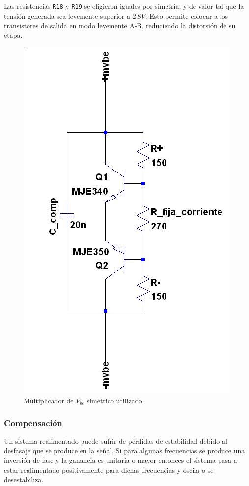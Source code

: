 \documentclass[a4paper,12pt,twoside]{article}
\begin{document}
Las resistencias \texttt{R18} y \texttt{R19} se eligieron iguales por simetría, y de valor tal que la tensión generada sea levemente superior a $2.8V$. Esto permite colocar a los transistores de salida en modo levemente A-B, reduciendo la distorsión de su etapa.


\begin{figure}[H]
\centering
\includegraphics[height=0.5\textwidth]{img/sim/mvbe}
\caption{Multiplicador de $V_{be}$ simétrico utilizado.}
\label{fig:mvbe} 
\end{figure}



\subsubsection{Compensación}

Un sistema realimentado puede sufrir de pérdidas de estabilidad debido al desfasaje que se produce en la señal. Si para algunas frecuencias se produce una inversión de fase y la ganancia es unitaria o mayor entonces el sistema pasa a estar realimentado positivamente para dichas frecuencias y oscila o se desestabiliza.
\end{document}
